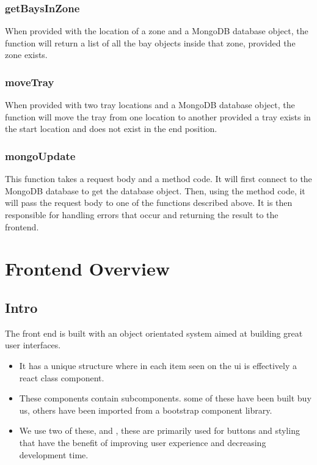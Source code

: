 \documentclass[letterpaper,10pt,english]{sphinxmanual}
\begin{document}
\subsubsection{getBaysInZone}
\label{\detokenize{docs/System_Overview/Backend_overview:getbaysinzone}}
When provided with the location of a zone and a MongoDB database object,
the function will return a list of all the bay objects inside that zone,
provided the zone exists.


\subsubsection{moveTray}
\label{\detokenize{docs/System_Overview/Backend_overview:movetray}}
When provided with two tray locations and a MongoDB database object, the
function will move the tray from one location to another provided a tray
exists in the start location and does not exist in the end position.


\subsubsection{mongoUpdate}
\label{\detokenize{docs/System_Overview/Backend_overview:mongoupdate}}
This function takes a request body and a method code. It will first
connect to the MongoDB database to get the database object. Then, using
the method code, it will pass the request body to one of the functions
described above. It is then responsible for handling errors that occur
and returning the result to the front\sphinxhyphen{}end.


\section{Frontend Overview}
\label{\detokenize{docs/System_Overview/Frontend_overview:frontend-overview}}\label{\detokenize{docs/System_Overview/Frontend_overview::doc}}

\subsection{Intro}
\label{\detokenize{docs/System_Overview/Frontend_overview:intro}}
The front end is built with  an object
orientated system aimed at building great user interfaces.
\begin{itemize}
\item {} 
It has a unique structure where in each item seen on the ui is effectively a
react class component.

\item {} 
These components contain subcomponents. some of these have been built buy us, others have been imported from a boot\sphinxhyphen{}strap component library.

\item {} 
We use two of these,  and ,
these are primarily used for buttons and styling that have the benefit of improving user
experience and decreasing development time.

\end{itemize}
\end{document}
